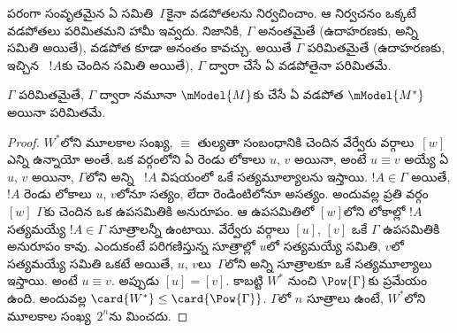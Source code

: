 \documentclass[../../../include/open-logic-section]{subfiles}
\begin{document}


 పరంగా సంవృతమైన
ఏ సమితి~$\Gamma$కైనా వడపోతలను నిర్వచించాం.
ఆ నిర్వచనం ఒక్కటే వడపోతలు పరిమితమని హామీ ఇవ్వదు.
నిజానికి, $\Gamma$ అనంతమైతే (ఉదాహరణకు, అన్ని
 సమితి అయితే),
వడపోత కూడా అనంతం కావచ్చు. అయితే $\Gamma$
పరిమితమైతే (ఉదాహరణకు, ఇచ్చిన
~$!A$కు చెందిన
 సమితి అయితే),
$\Gamma$ ద్వారా చేసే ఏ వడపోతైనా పరిమితమే.

\begin{prop}
  $\Gamma$ పరిమితమైతే, $\Gamma$ ద్వారా నమూనా
  $\mModel{M}$కు చేసే ఏ వడపోత $\mModel{M^*}$ అయినా
  పరిమితమే.
\end{prop}

\begin{proof}
  $W^*$లోని మూలకాల సంఖ్య, $\equiv$ తుల్యతా సంబంధానికి
  చెందిన వేర్వేరు వర్గాలు~$[w]$ ఎన్ని ఉన్నాయో అంతే. ఒక వర్గంలోని ఏ రెండు లోకాలు $u$, $v$ అయినా,
  అంటే $u \equiv v$ అయ్యే ఏ $u$, $v$ అయినా,
  $\Gamma$లోని అన్ని ~$!A$
  విషయంలో ఒకే సత్యమూల్యాలను ఇస్తాయి. $!A \in \Gamma$ అయితే,
  $!A$ రెండు లోకాలు $u$, $v$లోనూ సత్యం, లేదా రెండింటిలోనూ
  అసత్యం. అందువల్ల ప్రతి వర్గం~$[w]$
  $\Gamma$కు చెందిన ఒక ఉపసమితికి అనురూపం. ఆ ఉపసమితిలో
  $[w]$లోని లోకాల్లో $!A$ సత్యమయ్యే
  $!A \in \Gamma$ సూత్రాలన్నీ ఉంటాయి. వేర్వేరు వర్గాలు
  $[u]$, $[v]$ ఒకే $\Gamma$ ఉపసమితికి అనురూపం
  కావు. ఎందుకంటే పరిగణిస్తున్న సూత్రాల్లో $u$లో సత్యమయ్యే
   సమితి, $v$లో
  సత్యమయ్యే  సమితి
  ఒకటే అయితే, $u$, $v$లు~$\Gamma$లోని అన్ని
  సూత్రాలకూ ఒకే సత్యమూల్యాలు ఇస్తాయి. అంటే $u \equiv v$.
  అప్పుడు $[u] = [v]$. కాబట్టి $W^*$ నుంచి
  $\Pow{\Gamma}$కు
   ప్రమేయం ఉంది.
  అందువల్ల $\card{W^*} \le
  \card{\Pow{\Gamma}}$. $\Gamma$లో $n$ సూత్రాలు
  ఉంటే, $W^*$లోని మూలకాల సంఖ్య~$2^n$ను మించదు.
\end{proof}
\end{document}
